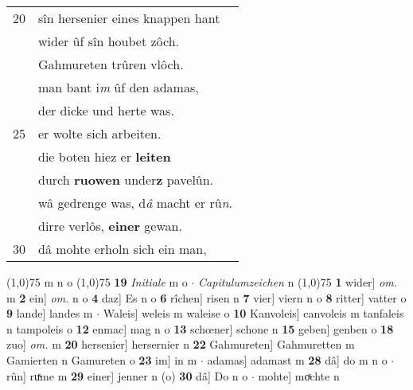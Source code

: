 \documentclass[8pt,a4paper,notitlepage]{article}
\begin{document}
\begin{table}[ht]
\begin{minipage}[t]{0.5\linewidth}
\begin{tabular}{rl}
20 & sîn hersenier eines knappen hant\\ 
 & wider ûf sîn houbet zôch.\\ 
 & Gahmureten trûren vlôch.\\ 
 & man bant i\textit{m} ûf den adamas,\\ 
 & der dicke und herte was.\\ 
25 & er wolte sich arbeiten.\\ 
 & die boten hiez er \textbf{leiten}\\ 
 & durch \textbf{ruowen} under\textbf{z} pavelûn.\\ 
 & wâ gedrenge was, d\textit{â} macht er rû\textit{n}.\\ 
 & dirre verlôs, \textbf{einer} gewan.\\ 
30 & dâ mohte erholn sich ein man,\\ 
\end{tabular}
\scriptsize
\line(1,0){75} \newline
m n o \newline
\line(1,0){75} \newline
\textbf{19} \textit{Initiale} m o   $\cdot$ \textit{Capitulumzeichen} n  \newline
\line(1,0){75} \newline
\textbf{1} wider] \textit{om.} m \textbf{2} ein] \textit{om.} n o \textbf{4} daz] Es n o \textbf{6} rîchen] risen n \textbf{7} vier] viern n o \textbf{8} ritter] vatter o \textbf{9} lande] landes m  $\cdot$ Waleis] weleis m waleise o \textbf{10} Kanvoleis] canvoleis m tanfaleis n tampoleis o \textbf{12} enmac] mag n o \textbf{13} schœner] schone n \textbf{15} geben] genben o \textbf{18} zuo] \textit{om.} m \textbf{20} hersenier] hersernier n \textbf{22} Gahmureten] Gahmuretten m Gamierten n Gamureten o \textbf{23} im] in m  $\cdot$ adamas] adamast m \textbf{28} dâ] do m n o  $\cdot$ rûn] ruͯme m \textbf{29} einer] jenner n (o) \textbf{30} dâ] Do n o  $\cdot$ mohte] moͯchte n \newline
\end{minipage}
\end{table}
\newpage
\end{document}
